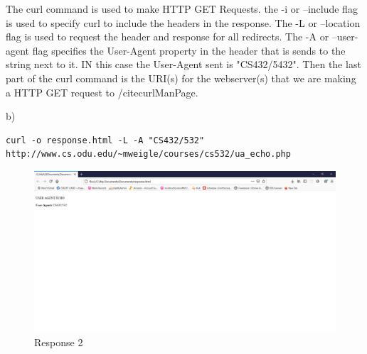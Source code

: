 \documentclass[12pt]{article}
\begin{document}
The curl command is used to make HTTP GET Requests. the -i  or --include flag is used to specify curl to include the headers in the response. The -L or --location flag is used to request the header 
and response for all redirects. The -A or --user-agent flag specifies the User-Agent property in the header that is sends to the string next to it. IN this case the User-Agent sent is "CS432/5432".
Then the last part of the curl command is the URI(s) for the webserver(s) that we are making a HTTP GET request to /cite{curlManPage}.

b)
\begin{lstlisting}[numbers=none, caption=Command, label=lst:q2BCommand]
curl -o response.html -L -A "CS432/532" http://www.cs.odu.edu/~mweigle/courses/cs532/ua_echo.php
\end{lstlisting}


\begin{figure}[h]
    \centering
    \includegraphics[trim=0 20 10 50, clip, width=\textwidth] {Q2/Q2b_Screenshot.png}
    \caption{Response 2}
    \label{fig:q2BResponse}
\end{figure}
\end{document}
